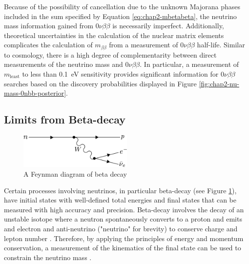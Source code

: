 Because of the possibility of cancellation due to the unknown Majorana phases included in the sum specified by Equation \ref{eq:chap2-mbetabeta}, the neutrino mass information gained from $0\nu\beta\beta$ is necessarily imperfect. Additionally, theoretical uncertainties in the calculation of the nuclear matrix elements complicates the calculation of $m_{\beta\beta}$ from a measurement of $0\nu\beta\beta$ half-life. Similar to cosmology, there is a high degree of complementarity between direct measurements of the neutrino mass and $0\nu\beta\beta$. In particular, a measurement of $m_\textrm{least}$ to less than 0.1~eV sensitivity provides significant information for $0\nu\beta\beta$ searches based on the discovery probabilities displayed in Figure \ref{fig:chap2-nu-mass-0nbb-posterior}.

\subsection{Limits from Beta-decay}

\begin{figure}[htbp]
    \centering
    \includegraphics*[width=0.5\textwidth]{figs/Chapter-2/230717_betadecay.png}
    \caption{\label{fig:chap2-beta-decay-diagram} A Feynman diagram of beta decay}
\end{figure}

Certain processes involving neutrinos, in particular beta-decay (see Figure \ref{fig:chap2-beta-decay-diagram}), have initial states with well-defined total energies and final states that can be measured with high accuracy and precision. Beta-decay involves the decay of an unstable isotope where a neutron spontaneously converts to a proton and emits and electron and anti-neutrino ("neutrino" for brevity) to conserve charge and lepton number \cite{nuclear_physics}. Therefore, by applying the principles of energy and momentum conservation, a measurement of the kinematics of the final state can be used to constrain the neutrino mass \cite{FORMAGGIO20211}. 

